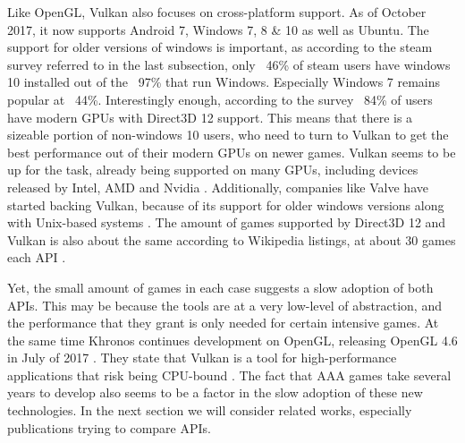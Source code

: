 Like OpenGL, Vulkan also focuses on cross-platform support.
As of October 2017, it now supports Android 7, Windows 7, 8 \& 10 as well as Ubuntu\cite{vulkanConformance}.
The support for older versions of windows is important, as according to the steam survey referred to in the last subsection, only ~46\% of steam users have windows 10 installed out of the ~97\% that run Windows\cite{steamStats}.
Especially Windows 7 remains popular at ~44\%. Interestingly enough, according to the survey ~84\% of users have modern \glspl{GPU} with Direct3D 12 support.
This means that there is a sizeable portion of non-windows 10 users, who need to turn to Vulkan to get the best performance out of their modern \glspl{GPU} on newer games.
Vulkan seems to be up for the task, already being supported on many \glspl{GPU}, including devices released by Intel, AMD and Nvidia \cite{vulkanConformance}.
Additionally, companies like Valve have started backing Vulkan, because of its support for older windows versions along with Unix-based systems \cite{siggraph2015}.
The amount of games supported by Direct3D 12 and Vulkan is also about the same according to Wikipedia listings, at about 30 games each \gls{API} \cite{wikiVulkanGames} \cite{wikiDX12Games}.

Yet, the small amount of games in each case suggests a slow adoption of both \glspl{API}.
This may be because the tools are at a very low-level of abstraction, and the performance that they grant is only needed for certain intensive games.
At the same time Khronos continues development on OpenGL, releasing OpenGL 4.6 in July of 2017 \cite{wikiOpenGL}.
They state that Vulkan is a tool for high-performance applications that risk being CPU-bound \cite{vulkanPresentationFeb2016}. 
The fact that AAA games take several years to develop also seems to be a factor in the slow adoption of these new technologies.
In the next section we will consider related works, especially publications trying to compare \glspl{API}. 

